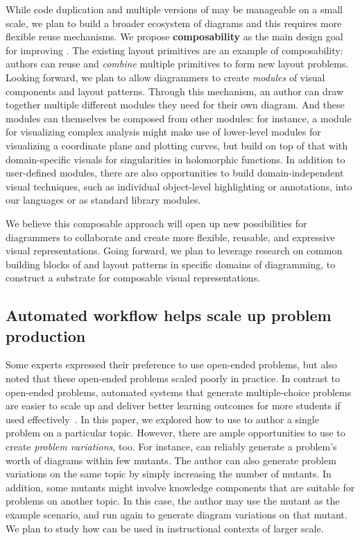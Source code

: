 While code duplication and multiple versions of \Style{} may be manageable on a small scale, we plan to build a broader ecosystem of diagrams and this requires more flexible reuse mechanisms. We propose \textbf{composability} as the main design goal for improving \Penrose{}. The existing layout primitives are an example of composability: authors can reuse and \emph{combine} multiple primitives to form new layout problems. Looking forward, we plan to allow diagrammers to create \emph{modules} of visual components and layout patterns. Through this mechanism, an author can draw together multiple different modules they need for their own diagram. And these modules can themselves be composed from other modules: for instance, a module for visualizing complex analysis might make use of lower-level modules for visualizing a coordinate plane and plotting curves, but build on top of that with domain-specific visuals for singularities in holomorphic functions. In addition to user-defined modules, there are also opportunities to build domain-independent visual techniques, such as individual object-level highlighting or annotations, into our languages or as standard library modules.

We believe this composable approach will open up new possibilities for diagrammers to collaborate and create more flexible, reusable, and expressive visual representations. Going forward, we plan to leverage research on common building blocks of and layout patterns in specific domains of diagramming, to construct a substrate for composable visual representations.


\subsection{Automated workflow helps scale up problem production}

Some experts expressed their preference to use open-ended problems, but also noted that these open-ended problems scaled poorly in practice. In contrast to open-ended problems, automated systems that generate multiple-choice problems are easier to scale up and deliver better learning outcomes for more students if used effectively~\cite{Wang2021}. In this paper, we explored how to use \Edgeworth to author a single problem on a particular topic. However, there are ample opportunities to use \Edgeworth to create \textit{problem variations}, too. For instance, \Edgeworth can reliably generate a problem's worth of diagrams within few mutants. The author can also generate problem variations on the same topic by simply increasing the number of mutants. In addition, some \Edgeworth mutants might involve knowledge components that are suitable for problems on another topic. In this case, the author may use the mutant as the example scenario, and run \Edgeworth again to generate diagram variations on that mutant. We plan to study how \Edgeworth can be used in instructional contexts of larger scale.


